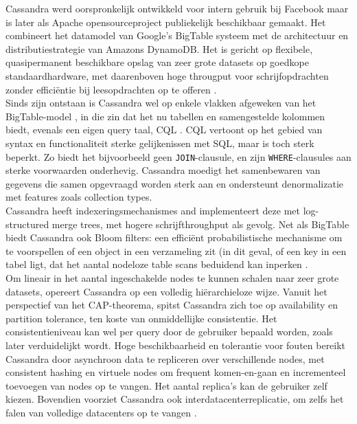 Cassandra werd oorspronkelijk ontwikkeld voor intern gebruik bij Facebook maar is later als Apache opensourceproject publiekelijk beschikbaar gemaakt. Het combineert het datamodel van Google's BigTable systeem met de architectuur en distributiestrategie van Amazons DynamoDB. Het is gericht op flexibele, quasipermanent beschikbare opslag van zeer grote datasets op goedkope standaardhardware, met daarenboven hoge througput voor schrijfopdrachten zonder effici\"entie bij leesopdrachten op te offeren \cite{borthakur2011apache}.\\
Sinds zijn ontstaan is Cassandra wel op enkele vlakken afgeweken van het BigTable-model \cite{cassandra_then&now}, in die zin dat het nu tabellen en samengestelde kolommen
biedt, evenals een eigen query taal, CQL \cite{cassandra_CQL}. CQL vertoont op het gebied van syntax en functionaliteit sterke gelijkenissen met SQL, maar is toch sterk beperkt. Zo biedt het bijvoorbeeld geen \texttt{JOIN}-clausule, en zijn \texttt{WHERE}-clausules aan sterke voorwaarden onderhevig. Cassandra moedigt het samenbewaren van gegevens die samen opgevraagd worden sterk aan en ondersteunt denormalizatie met features zoals collection types.\\
Cassandra heeft indexeringsmechanismes and implementeert deze met log-structured merge trees, met hogere schrijfthroughput als gevolg.
Net als BigTable biedt Cassandra ook Bloom filters: een effici\"ent probabilistische mechanisme om te voorspellen of een object in een verzameling zit (in dit geval, of een key in een tabel ligt, dat het aantal nodeloze table scans beduidend kan inperken \cite{mullin1983second}.\\
Om lineair in het aantal ingeschakelde nodes te kunnen schalen naar zeer grote datasets, opereert Cassandra op een volledig hi\"erarchieloze wijze. Vanuit het perspectief van het CAP-theorema, spitst Cassandra zich toe op availability en partition tolerance, ten koste van onmiddellijke consistentie. Het consistentieniveau kan wel per query door de gebruiker bepaald worden, zoals later verduidelijkt wordt. Hoge beschikbaarheid en tolerantie voor fouten bereikt Cassandra door asynchroon data te repliceren over verschillende nodes, met consistent hashing en virtuele nodes om frequent komen-en-gaan en incrementeel toevoegen van nodes op te vangen. Het aantal replica's kan de gebruiker zelf kiezen. Bovendien voorziet Cassandra ook interdatacenterreplicatie, om zelfs het falen van volledige datacenters op te vangen \cite{decandia2007dynamo} \cite{lakshman2010cassandra} \cite{cassandra_then&now}.\\
